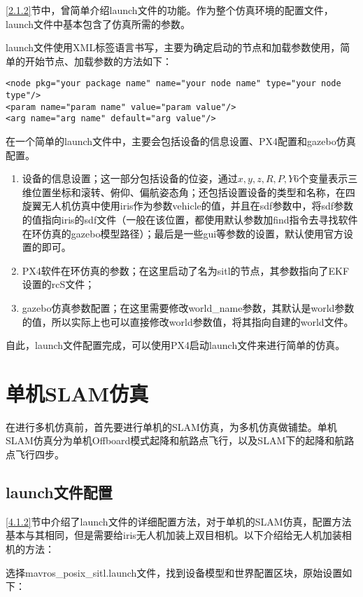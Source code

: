 \ref{2.1.2}节中，曾简单介绍launch文件的功能。作为整个仿真环境的配置文件，launch文件中基本包含了仿真所需的参数。

launch文件使用XML标签语言书写，主要为确定启动的节点和加载参数使用，简单的开始节点、加载参数的方法如下：

\begin{verbatim}
<node pkg="your package name" name="your node name" type="your node type"/>
<param name="param name" value="param value"/>
<arg name="arg name" default="arg value"/>
\end{verbatim}

在一个简单的launch文件中，主要会包括设备的信息设置、PX4配置和gazebo仿真配置。

\begin{enumerate}
	\item 设备的信息设置；这一部分包括设备的位姿，通过$x,y,z,R,P,Y$6个变量表示三维位置坐标和滚转、俯仰、偏航姿态角；还包括设置设备的类型和名称，在四旋翼无人机仿真中使用iris作为参数vehicle的值，并且在sdf参数中，将sdf参数的值指向iris的sdf文件（一般在该位置，都使用默认参数加find指令去寻找软件在环仿真的gazebo模型路径）；最后是一些gui等参数的设置，默认使用官方设置的即可。
	\item PX4软件在环仿真的参数；在这里启动了名为sitl的节点，其参数指向了EKF设置的rcS文件；
	\item gazebo仿真参数配置；在这里需要修改world\_name参数，其默认是world参数的值，所以实际上也可以直接修改world参数值，将其指向自建的world文件。
\end{enumerate}

自此，launch文件配置完成，可以使用PX4启动launch文件来进行简单的仿真。


\section{单机SLAM仿真}

在进行多机仿真前，首先要进行单机的SLAM仿真，为多机仿真做铺垫。单机SLAM仿真分为单机Offboard模式起降和航路点飞行，以及SLAM下的起降和航路点飞行四步。

\subsection{launch文件配置} \label{4.2.1}

\ref{4.1.2}节中介绍了launch文件的详细配置方法，对于单机的SLAM仿真，配置方法基本与其相同，但是需要给iris无人机加装上双目相机。以下介绍给无人机加装相机的方法：

选择mavros\_posix\_sitl.launch文件，找到设备模型和世界配置区块，原始设置如下：


